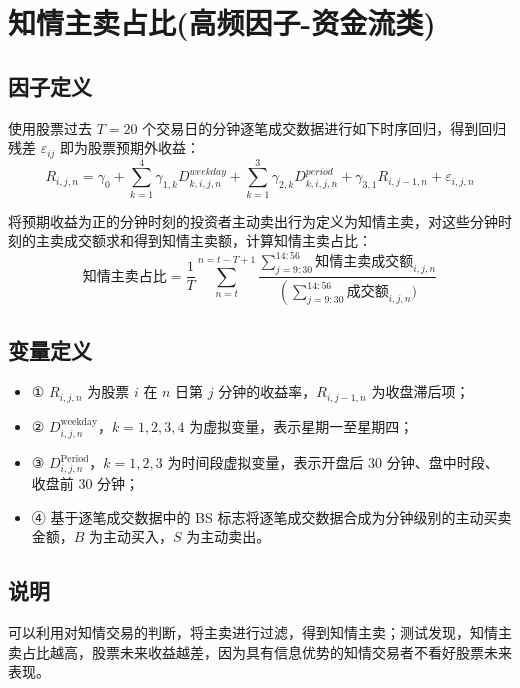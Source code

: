 \documentclass{article}
\begin{document}
\section{知情主卖占比(高频因子-资金流类)}

\subsection{因子定义}
使用股票过去 \( T=20 \) 个交易日的分钟逐笔成交数据进行如下时序回归，得到回归残差 \(\varepsilon_{ij}\) 即为股票预期外收益：
\begin{equation}
    R_{i,j,n} = \gamma_0 + \sum_{k=1}^4 \gamma_{1,k} D_{k,i,j,n}^{weekday} + \sum_{k=1}^3 \gamma_{2,k} D_{k,i,j,n}^{period} + \gamma_{3,1} R_{i,j-1,n} + \varepsilon_{i,j,n}
\end{equation}

将预期收益为正的分钟时刻的投资者主动卖出行为定义为知情主卖，对这些分钟时刻的主卖成交额求和得到知情主卖额，计算知情主卖占比：
\begin{equation}
    \text{知情主卖占比} = \frac{1}{T} \sum_{n=t}^{n=t-T+1} \frac { \sum_{j=9:30}^{14:56} \text{知情主卖成交额}_{i,j,n} } {\left( \sum_{j=9:30}^{14:56} \text{成交额}_{i,j,n} )}
\end{equation}

\subsection{变量定义}
\begin{itemize}
    \item ① \( R_{i,j,n} \) 为股票 \( i \) 在 \( n \) 日第 \( j \) 分钟的收益率，\( R_{i,j-1,n} \) 为收盘滞后项；
    \item ② \( D_{i,j,n}^{\mathrm{weekday}} \)，\( k=1,2,3,4 \) 为虚拟变量，表示星期一至星期四；
    \item ③ \( D_{i,j,n}^{\mathrm{Period}} \)，\( k=1,2,3 \) 为时间段虚拟变量，表示开盘后 30 分钟、盘中时段、收盘前 30 分钟；
    \item ④ 基于逐笔成交数据中的 BS 标志将逐笔成交数据合成为分钟级别的主动买卖金额，\( B \) 为主动买入，\( S \) 为主动卖出。
\end{itemize}

\subsection{说明}
可以利用对知情交易的判断，将主卖进行过滤，得到知情主卖；测试发现，知情主卖占比越高，股票未来收益越差，因为具有信息优势的知情交易者不看好股票未来表现。
\end{document}
